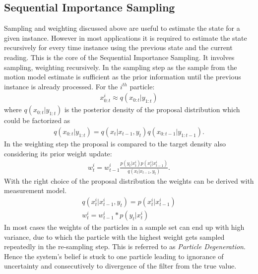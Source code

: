 \subsection{Sequential Importance Sampling}
Sampling and weighting discussed above are useful to estimate the state for a given instance. However in most applications it is required to estimate the state recursively for every time instance using the previous state and the current reading. This is the core of the Sequential Importance Sampling. It involves sampling, weighting recursively. In the sampling step as the sample from the motion model estimate is sufficient as the prior information until the previous instance is already processed.
For the ${i}^{th}$ particle:
\begin{gather} \label{SIS_Sample}
    x_{0:t}^{i} \approx q(x_{0:t}| y_{1:t}) 
\end{gather}
where ${q(x_{0:t}| y_{1:t})}$ is the posterior density of the proposal distribution which could be factorized as 
\begin{gather} \label{SIS_propfact}
    q(x_{0:t}| y_{1:t}) = q(x_t|x_{t-1},y_{t}) q(x_{0:t-1}| y_{1:t-1}).
\end{gather}
In the weighting step the proposal is compared to the target density also considering its prior weight update:
\begin{gather} \label{SIS_weight}
    w_{t}^{i} = w_{t-1}^{i} \frac{p(y_{t}|x_{t}^{i}) p(x_{t}^{i}|x_{t-1}^{i})}{q(x_t|x_{t-1},y_{t})}.
\end{gather}
With the right choice of the proposal distribution the weights can be derived with measurement model.
\begin{gather} \label{SIS_weightprop}
    q(x^i_t|x^i_{t-1},y_{t}) = p(x^i_t|x^i_{t-1})\\
    w_{t}^{i} = w_{t-1}^{i} * p(y_{t}|x_{t}^{i})
\end{gather}
In most cases the weights of the particles in a sample set can end up with high variance, due to which the particle with the highest weight gets sampled repeatedly in the re-sampling step. This is referred to as \textit{Particle Degeneration}. Hence the system's belief is stuck to one particle leading to ignorance of uncertainty and consecutively to divergence of the filter from the true value.

